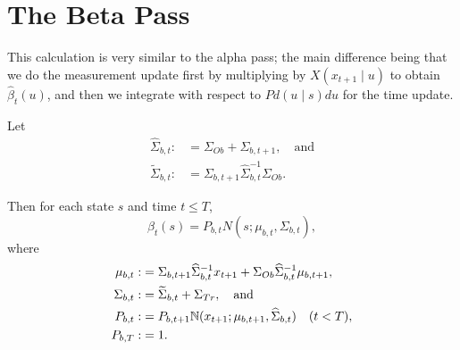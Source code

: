 \documentclass[12pt,leqno]{article}
\begin{document}
\section{The Beta Pass}
This calculation is very similar to the alpha pass; the main difference being that we do
the measurement update first by multiplying by $X(x_{t+1}\mid u)$ to obtain $\hat{\beta}_t(u)$,
and then we integrate with respect to $Pd(u\mid s)du$ for the time update.  

\begin{Thm}\label{beta:1}
  Let 
\begin{align*}
  \widehat{\Sigma}_{b,t} :&= \Sigma_{Ob}+\Sigma_{b,t+1},\quad\text{and}\\
    \widetilde{\Sigma}_{b,t} :&= \Sigma_{b,t+1}\widehat{\Sigma}_{b,t}^{-1}\Sigma_{Ob}.
\end{align*}

  Then for each state $s$ and time $t \le T$,
$$
  \beta_t(s) = P_{b,t}N(s;\mu_{b,t},\Sigma_{b,t}),
$$
where
\begin{align*}
  \mu_{b,t} :&= \Sigma_{b,t+1}\widehat{\Sigma}_{b,t}^{-1}x_{t+1} + \Sigma_{Ob}\widehat{\Sigma}_{b,t}^{-1}\mu_{b,t+1},\\
  \Sigma_{b,t} :&= \widetilde{\Sigma}_{b,t} + \Sigma_{Tr},\quad\text{and}\\
  P_{b,t}:&=P_{b,t+1}{\mathbb N}(x_{t+1};\mu_{b,t+1},\widehat{\Sigma}_{b,t})
\quad(t< T),\\
  P_{b,T} :&= 1.
\end{align*}
\end{Thm}
\end{document}
